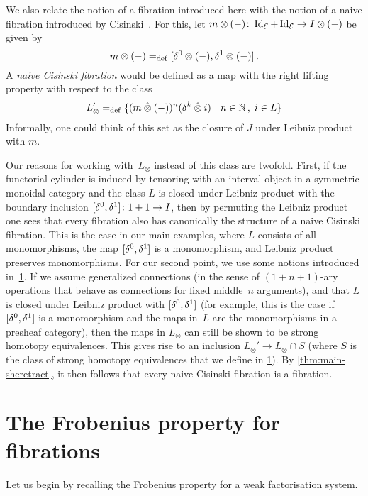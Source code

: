 \documentclass[reqno,10pt,a4paper,oneside,draft]{amsart}
\begin{document}
\begin{remark} \label{cisinski-remark}
We also relate the notion of a fibration introduced here with the notion of a naive fibration introduced by Cisinski~\cite{cisinski-asterisque}.
For this, let $m \otimes (-)  \colon \operatorname{Id}_{\mathcal{E}} + \operatorname{Id}_{\mathcal{E}} \to I \otimes (-)$ be given by
\[
  m \otimes (-) =_{\operatorname{def}} [\delta^0 \otimes (-), \delta^1 \otimes (-)] \, .
\]
A \emph{naive Cisinski fibration} would be defined as a map with the right lifting property with respect to the class
\[
L_\otimes' =_{\operatorname{def}} \{ (m \mathbin{\hat{\otimes}} (-))^n ( \delta^k \mathbin{\hat{\otimes}} i ) \ | \ n \in \mathbb{N} \, , \;  i \in L \} 
\]
Informally, one could think of this set as the closure of $J$ under Leibniz product with $m$. 

Our reasons for working with~$L_\otimes$ instead of this class are twofold. First, if the functorial cylinder is induced by tensoring with an interval object in a symmetric monoidal category and the class $L$ is closed under Leibniz product with the boundary inclusion $[\delta^0, \delta^1] \colon 1 + 1 \to I$, then by permuting the Leibniz product one sees that every fibration also has canonically the structure of a  naive Cisinski fibration.
This is the case in our main examples, where $L$ consists of all monomorphisms, the map $[\delta^0, \delta^1]$ is a monomorphism, and Leibniz product preserves monomorphisms. For our second point, we use some notions introduced in~\cref{sec:frobprop}.
If we assume generalized connections (in the sense of $(1+n+1)$-ary operations that behave as connections for fixed middle~$n$ arguments), and that $L$ is closed under Leibniz product with $[\delta^0, \delta^1]$ (for example, this is the case if $[\delta^0, \delta^1]$ is a monomorphism and the maps in~$L$ are the monomorphisms in a presheaf category), then the maps in $L_\otimes$ can still be shown to be strong homotopy equivalences. This gives rise to an inclusion $L_\otimes' \to L_\otimes \cap S$  (where $S$ is the class of strong homotopy equivalences that we define in \cref{sec:frobprop}). By \cref{thm:main-sheretract}, it then follows that every naive Cisinski fibration is a fibration.
\end{remark}

\newpage

\section{The Frobenius property for fibrations}
\label{sec:frobprop}

Let us begin by recalling the Frobenius property for a weak factorisation system.
\end{document}

